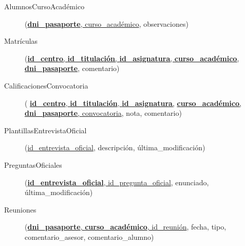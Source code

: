   \begin{description}
    \item[AlumnosCursoAcadémico] \begin{flushleft}(\underline{\textbf{dni\_pasaporte},
    curso\_académico}, observaciones)\end{flushleft}
  \end{description}

  \begin{description}
    \item[Matrículas] \begin{flushleft}(\underline{\textbf{id\_centro},
    \textbf{id\_titulación}, \textbf{id\_asignatura},
    \textbf{curso\_académico},} \underline{\textbf{dni\_pasaporte}},
     comentario)\end{flushleft}
  \end{description}

  \begin{description}
    \item[CalificacionesConvocatoria] \begin{flushleft}(
    \underline{\textbf{id\_centro}, \textbf{id\_titulación},
    \textbf{id\_asignatura},} \underline{\textbf{curso\_académico},
    \textbf{dni\_pasaporte}, convocatoria}, nota, comentario)\end{flushleft}
  \end{description}

  \begin{description}
    \item[PlantillasEntrevistaOficial] \begin{flushleft}(\underline{id\_entrevista\_oficial}, descripción,
    última\_modificación)\end{flushleft}
  \end{description}

  \begin{description}
    \item[PreguntasOficiales] \begin{flushleft}(\underline{\textbf{id\_entrevista\_oficial},
    id\_pregunta\_oficial}, enunciado, última\_modificación)\end{flushleft}
  \end{description}

  \begin{description}
    \item[Reuniones] \begin{flushleft}(\underline{\textbf{dni\_pasaporte},
    \textbf{curso\_académico}, id\_reunión}, fecha, tipo,
    comentario\_asesor, comentario\_alumno)\end{flushleft}
  \end{description}

